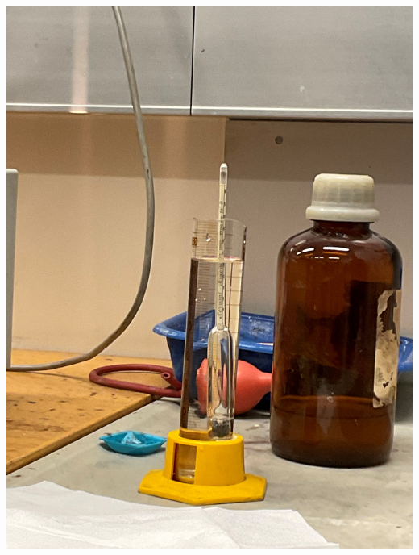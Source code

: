 \documentclass[11pt,ngerman]{scrartcl}
\begin{document}
\begin{minipage}{\textwidth}
	\begin{minipage}[t]{0.49\textwidth}
		\centering
		\includegraphics[width=\textwidth]{ente}
		\label{fig:ente}
	\end{minipage}
	\vspace{2mm}
	\begin{minipage}[t]{0.49\textwidth}
		\centering

\end{minipage}
\end{minipage}
\end{document}

